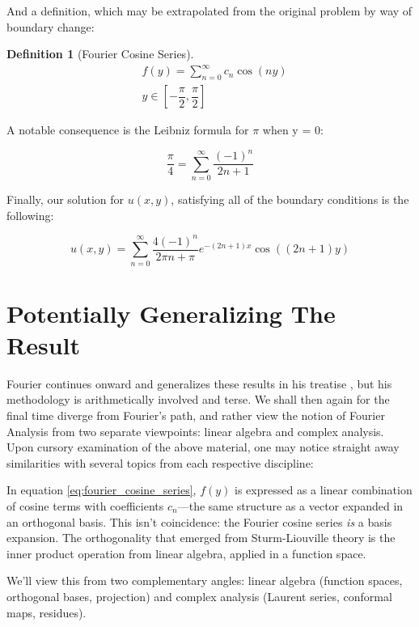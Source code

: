 \documentclass[12pt,a4paper]{report}
\theoremstyle{thms}
\theoremstyle{defns}
\newtheorem{definition}{Definition}[section]
\begin{document}
And a definition, which may be extrapolated from the original problem by way of boundary change:

\begin{definition}[Fourier Cosine Series]
    \begin{align}
         & f(y) = \sum_{n=0}^{\infty} c_n\cos(ny)  \\
         & y \in [-\dfrac{\pi}{2}, \dfrac{\pi}{2}]
        \label{eq:fourier_cosine_series}
    \end{align}
\end{definition}

A notable consequence is the Leibniz formula for $\pi$ when y = 0:

\begin{equation}
    \dfrac{\pi}{4} = \sum_{n=0}^{\infty} \dfrac{(-1)^n}{2n+1}
\end{equation}

Finally, our solution for $u(x, y)$, satisfying all of the boundary conditions is the following:

\begin{equation}
    u(x, y) = \sum_{n=0}^{\infty} \dfrac{4(-1)^n}{2\pi n + \pi}e^{-(2n + 1)x}\cos((2n+1)y)
\end{equation}

\section{Potentially Generalizing The Result}

Fourier continues onward and generalizes these results in his treatise \cite{heat_fourier}, but his methodology is arithmetically involved and terse. We shall then again for the final time diverge from Fourier's path, and rather view the notion of Fourier Analysis from two separate viewpoints: linear algebra and complex analysis.\\
Upon cursory examination of the above material, one may notice straight away similarities with several topics from each respective discipline:

In equation \eqref{eq:fourier_cosine_series}, $f(y)$ is expressed as a linear combination of cosine terms with coefficients $c_n$—the same structure as a vector expanded in an orthogonal basis. This isn't coincidence: the Fourier cosine series \textit{is} a basis expansion. The orthogonality that emerged from Sturm-Liouville theory is the inner product operation from linear algebra, applied in a function space.

We'll view this from two complementary angles: linear algebra (function spaces, orthogonal bases, projection) and complex analysis (Laurent series, conformal maps, residues).
\end{document}
